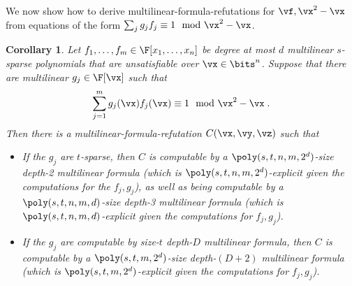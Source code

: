 \documentclass[11pt]{article}
\numberwithin{equation}{section}
\newtheorem{corollary}[theorem]{Corollary}
\theoremstyle{definition}
\theoremstyle{plain}
\begin{document}
We now show how to derive multilinear-formula-\lbIPS refutations for $\vf,\vx^2-\vx$ from equations of the form $\sum_j g_jf_j\equiv 1\mod\vx^2-\vx$.

\begin{corollary}\label{res:multilin:multilin-lbIPS}
        Let $f_1,\ldots,f_m\in\F[x_1,\ldots,x_n]$ be degree at most $d$ multilinear $s$-sparse polynomials that are unsatisfiable over $\vx\in\bits^n$.  Suppose that there are multilinear $g_j\in\F[\vx]$ such that
        \[
                \sum_{j=1}^m g_j(\vx)f_j(\vx)\equiv 1\mod\vx^2-\vx
                \;.
        \]
        Then there is a multilinear-formula-\lbIPS refutation $C(\vx,\vy,\vz)$ such that
        \begin{itemize}
                \item If the $g_j$ are $t$-sparse, then $C$ is computable by a $\poly(s,t,n,m,2^d)$-size depth-2 multilinear formula (which is $\poly(s,t,n,m,2^d)$-explicit given the computations for the $f_j,g_j$), as well as being computable by a $\poly(s,t,n,m,d)$-size depth-3 multilinear formula (which is $\poly(s,t,n,m,d)$-explicit given the computations for $f_j,g_j$).
                \item If the $g_j$ are computable by size-$t$ depth-$D$ multilinear formula, then $C$ is computable by a $\poly(s,t,m,2^d)$-size depth-$(D+2)$ multilinear formula (which is $\poly(s,t,m,2^d)$-explicit given the computations for $f_j,g_j$).
        \end{itemize}
\end{corollary}
\end{document}
